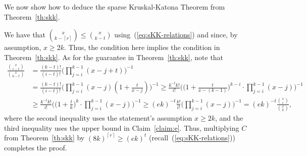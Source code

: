\documentclass[11pt]{article}
\makeatletter
\renewenvironment{proof}[1][\proofname]
{\par\pushQED{\qed}
	\normalfont\topsep6\p@\@plus6\p@\relax\trivlist
	\item[\hskip\labelsep\bfseries#1\@addpunct{.}]
	\ignorespaces}
{\popQED\endtrivlist\@endpefalse}
\newcommand{\FF}{{\cal F}}
\newcommand{\ceil}[1]{\left\lceil #1 \right\rceil}
\newcommand{\N}{\mathbb{N}}
\makeatother
\begin{document}
We now show how to deduce the sparse Kruskal-Katona Theorem from Theorem~\ref{th:skk}. 
\begin{proof}[Proof of Theorem~\ref{th:skk-intro}]
	We have that $\binom{x}{k-\ceil{r}} \le \binom{x}{k-t}$ using~(\ref{eq:sKK-relations}) and since, by assumption, $x \ge 2k$. Thus, the condition here implies the condition in Theorem~\ref{th:skk}.
	As for the guarantee in Theorem~\ref{th:skk}, note that
	\begin{align*}
	\frac{\binom{x}{i-t}}{\binom{x}{k-t}} &= \frac{(k-t)!}{(i-t)!} \bigg(\prod_{j=i}^{k-1}(x-j+t)\bigg)^{-1}\\
	&= \frac{(k-t)!}{(i-t)!} \bigg(\prod_{j=i}^{k-1}(x-j) \left(1+\frac{t}{x-j}\right) \bigg)^{-1} 
	\ge \frac{k^{-t}k!}{i!} \bigg(\bigg(1+\frac{t}{x-(k-1)}\bigg)^{k-i} \cdot \prod_{j=i}^{k-1} (x-j) \bigg)^{-1}\\
	&\ge \frac{k^{-t}k!}{i!} \bigg(\Big(1+\frac{t}{k}\Big)^{k} \cdot \prod_{j=i}^{k-1} (x-j) \bigg)^{-1}
	\ge (ek)^{-t}\frac{k!}{i!} \bigg(\prod_{j=i}^{k-1} (x-j) \bigg)^{-1}
	= (ek)^{-t}\frac{\binom{x}{i}}{\binom{x}{k}} ,
	\end{align*}
	where the second inequality uses the statement's assumption $x \ge 2k$, and the third inequality uses the upper bound in Claim~\ref{claim:e}.
	Thus, multiplying $C$ from Theorem~\ref{th:skk} by $(8k)^{\ceil{r}} %
	\ge (ek)^t$ (recall~(\ref{eq:sKK-relations})) completes the proof.
\end{proof}
\end{document}
